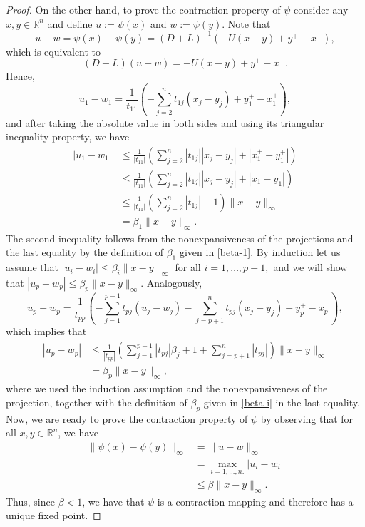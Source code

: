 \documentclass[11pt]{article}
\newcommand{\R}{\mathbb R}
\begin{document}
\begin{proof}
On the other hand, to prove the contraction property of $\psi$ consider  any $x,y \in \R^n$ and define $u:=\psi(x)$ and $w:=\psi(y)$. Note that 
$$ u-w = \psi(x)-\psi(y) = (D+L)^{-1}(-U(x-y)+y^+-x^+),$$ which is equivalent to
$$ (D+L)(u-w) = -U(x-y)+y^+-x^+.$$
Hence,
\begin{equation*}
u_1-w_1 = \frac{1}{t_{11}}\left( -\sum_{j=2}^n t_{1j}(x_j-y_j) + y_1^+-x_1^+ \right),
\end{equation*} and after taking the absolute value in both sides and using its triangular inequality property, we have 
\begin{align*}
|u_1-w_1| &\leq \frac{1}{|t_{11}|}\left( \sum_{j=2}^n |t_{1j}||x_j-y_j| + |x_1^+-y_1^+| \right)\\
&\leq \frac{1}{|t_{11}|}\left( \sum_{j=2}^n |t_{1j}||x_j-y_j| + |x_1-y_1| \right)\\
&\leq \frac{1}{|t_{11}|}\left( \sum_{j=2}^n |t_{1j}| + 1\right) \|x-y\|_{\infty} \\
&= \beta_1 \|x-y\|_{\infty}.
\end{align*} The second inequality follows from the nonexpansiveness of the projections and the last equality by the definition of $\beta_1$ given in \eqref{beta-1}.
By induction let us assume that $|u_i-w_i| \leq \beta_i\|x-y\|_{\infty}$ for all $i=1,\dots,p-1,$ and we will show that $|u_p-w_p| \leq \beta_p\|x-y\|_{\infty}$. Analogously, 
\begin{equation*}
u_p-w_p = \frac{1}{t_{pp}}\left( -\sum_{j=1}^{p-1} t_{pj}(u_j-w_j) - \sum_{j=p+1}^n t_{pj}(x_j-y_j) + y_p^+-x_p^+ \right),
\end{equation*} which implies that
\begin{align*}
|u_p-w_p| &\leq \frac{1}{|t_{pp}|}\left(\sum_{j=1}^{p-1}|t_{pj}|\beta_j+1+\sum_{j=p+1}^n|t_{pj}| \right)\|x-y\|_{\infty}\\
&= \beta_p\|x-y\|_{\infty},
\end{align*} where we used the induction assumption and the nonexpansiveness of the projection, together with the definition of $\beta_p$ given in \eqref{beta-i} in the last equality.
Now, we are ready to prove the contraction property of $\psi$ by observing that for all $x,y \in \R^n$, we have
\begin{align*}
\| \psi(x)-\psi(y) \|_{\infty} &= \| u-w \|_{\infty} \\
&= \max_{i=1,\dots,n.}|u_i-w_i|\\
&\leq \beta\|x-y\|_{\infty}.
\end{align*} Thus, since $\beta < 1$, we have that $\psi$ is a contraction mapping and therefore has a unique fixed point.
\end{proof}
\end{document}
